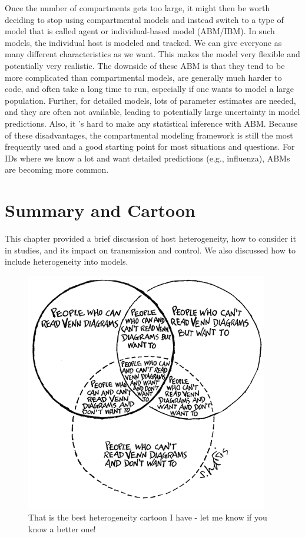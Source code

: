\documentclass[]{book}
\theoremstyle{definition}
\theoremstyle{definition}
\theoremstyle{definition}
\theoremstyle{remark}
\begin{document}
Once the number of compartments gets too large, it might then be worth
deciding to stop using compartmental models and instead switch to a type
of model that is called agent or individual-based model (ABM/IBM). In
such models, the individual host is modeled and tracked. We can give
everyone as many different characteristics as we want. This makes the
model very flexible and potentially very realistic. The downside of
these ABM is that they tend to be more complicated than compartmental
models, are generally much harder to code, and often take a long time to
run, especially if one wants to model a large population. Further, for
detailed models, lots of parameter estimates are needed, and they are
often not available, leading to potentially large uncertainty in model
predictions. Also, it 's hard to make any statistical inference with
ABM. Because of these disadvantages, the compartmental modeling
framework is still the most frequently used and a good starting point
for most situations and questions. For IDs where we know a lot and want
detailed predictions (e.g., influenza), ABMs are becoming more common.

\section{Summary and Cartoon}\label{summary-and-cartoon-9}

This chapter provided a brief discussion of host heterogeneity, how to
consider it in studies, and its impact on transmission and control. We
also discussed how to include heterogeneity into models.

\begin{figure}
\centering
\includegraphics{./images/crazyvenndiagram.png}
\caption{\label{fig:crazyvenndiagram}That is the best heterogeneity cartoon
I have - let me know if you know a better one!}
\end{figure}
\end{document}
